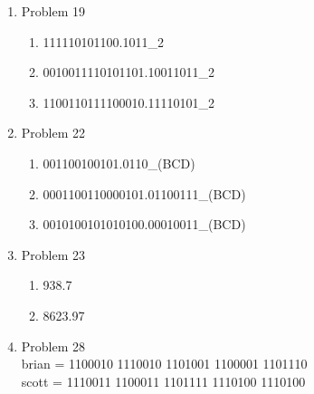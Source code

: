 \begin{enumerate}[leftmargin=2cm,labelsep=.5cm,label=\bf\arabic*.]
\item Problem 19
\begin{enumerate}
  \item 111110101100.1011_2
  \item 0010011110101101.10011011_2
  \item 1100110111100010.11110101_2
\end{enumerate}

\item Problem 22
\begin{enumerate}
  \item 001100100101.0110_{(BCD)}
  \item 0001100110000101.01100111_{(BCD)}
  \item 0010100101010100.00010011_{(BCD)}
\end{enumerate}

\item Problem 23
\begin{enumerate}
  \item 938.7
  \item 8623.97
\end{enumerate}

\item Problem 28\\
brian = 1100010 1110010 1101001 1100001 1101110\\
scott = 1110011 1100011 1101111 1110100 1110100\\

\end{enumerate}